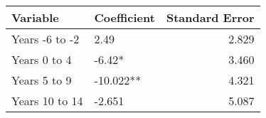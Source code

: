 \begin{tabular}{llr}
\toprule
      Variable & Coefficient &  Standard Error \\
\midrule
Years -6 to -2 &        2.49 &           2.829 \\
  Years 0 to 4 &      -6.42* &           3.460 \\
  Years 5 to 9 &   -10.022** &           4.321 \\
Years 10 to 14 &      -2.651 &           5.087 \\
\bottomrule
\end{tabular}
